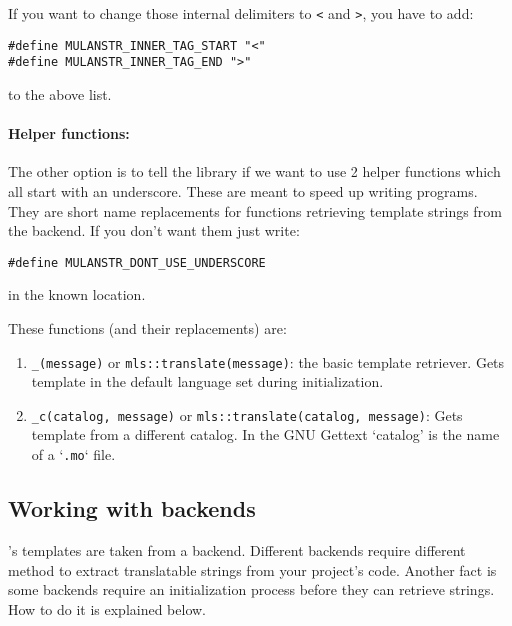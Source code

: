 If you want to change those internal delimiters to \verb+<+ and \verb+>+, you have to add:
\begin{verbatim}
#define MULANSTR_INNER_TAG_START "<"
#define MULANSTR_INNER_TAG_END ">"
\end{verbatim} to the above list.

\paragraph{Helper functions:}\label{helpFunc} The other option is to tell the library if we want to use 2 helper functions which all start with an underscore.
These are meant to speed up writing programs. They are short name replacements for functions retrieving template strings from the backend.
If you don't want them just write:
\begin{verbatim}
#define MULANSTR_DONT_USE_UNDERSCORE
\end{verbatim} in the known location.

These functions (and their replacements) are:
\begin{enumerate}
	\item \texttt{\_(message)} or \texttt{mls::translate(message)}: the basic template retriever. Gets template in the default language set during initialization.
	\item \texttt{\_c(catalog, message)} or \texttt{mls::translate(catalog, message)}: Gets template from a different catalog. 
	In the GNU Gettext `catalog' is the name of a `\texttt{.mo}` file.
\end{enumerate}


\subsection{Working with backends}
\mulan{}'s templates are taken from a backend. Different backends require different method to extract translatable strings from your project's code.
Another fact is some backends require an initialization process before they can retrieve strings. How to do it is explained below.

